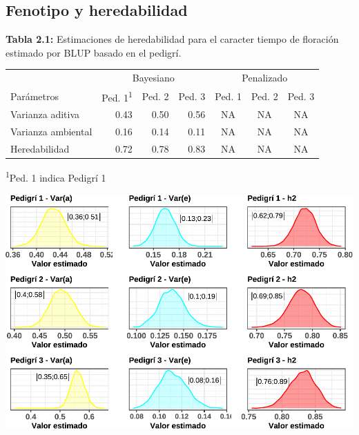 \documentclass[11pt,spanish,a4paper,oneside,]{book} %
\begin{document}
\hypertarget{fenotipo-y-heredabilidad}{%
\subsection{Fenotipo y heredabilidad}\label{fenotipo-y-heredabilidad}}

\begin{center}
\textbf{Tabla 2.1:} Estimaciones de heredabilidad para el caracter tiempo de floración estimado por BLUP basado en el pedigrí.

\end{center}

\captionsetup[table]{labelformat=empty,skip=1pt}
\begin{longtable}{lrrrccc}
\toprule
 & \multicolumn{3}{c}{Bayesiano} & \multicolumn{3}{c}{Penalizado} \\ 
 \cmidrule(lr){2-4} \cmidrule(lr){5-7}
Parámetros & Ped. 1\textsuperscript{1} & Ped. 2 & Ped. 3 & Ped. 1 & Ped. 2 & Ped. 3 \\ 
\midrule
Varianza aditiva & 0.43 & 0.50 & 0.56 & NA & NA & NA \\ 
Varianza ambiental & 0.16 & 0.14 & 0.11 & NA & NA & NA \\ 
Heredabilidad & 0.72 & 0.78 & 0.83 & NA & NA & NA \\ 
 \bottomrule
\end{longtable}
\vspace{-5mm}
\begin{minipage}{\linewidth}
\textsuperscript{1}Ped. 1 indica Pedigrí 1 \\ 
\end{minipage}

\begin{center}\includegraphics[width=1\linewidth]{figures/covar_h2} \end{center}
\end{document}
